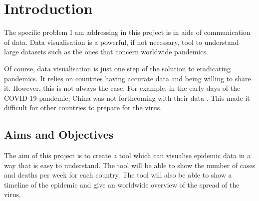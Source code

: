 \documentclass{report}
\begin{document}



\chapter{Introduction}
The specific problem I am addressing in this project is in aide of communication of data. Data visualisation is a powerful, if not necessary, tool to understand large datasets such as the ones that concern worldwide pandemics.

Of course, data visualisation is just one step of the solution to eradicating pandemics. It relies on countries having accurate data and being willing to share it. However, this is not always the case. For example, in the early days of the COVID-19 pandemic, China was not forthcoming with their data \cite{chinawrongdata:2019}. This made it difficult for other countries to prepare for the virus.

\section{Aims and Objectives}
The aim of this project is to create a tool which can visualise epidemic data in a way that is easy to understand. The tool will be able to show the number of cases and deaths per week for each country. The tool will also be able to show a timeline of the epidemic and give an worldwide overview of the spread of the virus.
\end{document}
